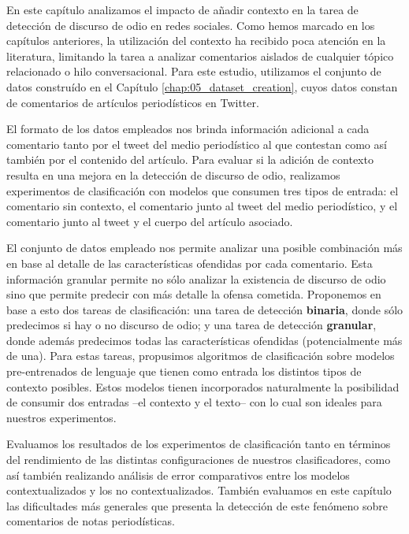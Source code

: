 \label{chap:06_contextualized_hate_speech}

En este capítulo analizamos el impacto de añadir contexto en la tarea de detección de discurso de odio en redes sociales. Como hemos marcado en los capítulos anteriores, la utilización del contexto ha recibido poca atención en la literatura, limitando la tarea a analizar comentarios aislados de cualquier tópico relacionado o hilo conversacional. Para este estudio, utilizamos el conjunto de datos construído en el Capítulo \ref{chap:05_dataset_creation}, cuyos datos constan de comentarios de artículos periodísticos en Twitter.

El formato de los datos empleados nos brinda información adicional a cada comentario tanto por el tweet del medio periodístico al que contestan como así también por el contenido del artículo. Para evaluar si la adición de contexto resulta en una mejora en la detección de discurso de odio, realizamos experimentos de clasificación con modelos que consumen tres tipos de entrada: el comentario sin contexto, el comentario junto al tweet del medio periodístico, y el comentario junto al tweet y el cuerpo del artículo asociado.


El conjunto de datos empleado nos permite analizar una posible combinación más en base al detalle de las características ofendidas por cada comentario. Esta información granular permite no sólo analizar la existencia de discurso de odio sino que permite predecir con más detalle la ofensa cometida. Proponemos en base a esto dos tareas de clasificación: una tarea de detección \textbf{binaria}, donde sólo predecimos si hay o no discurso de odio; y una tarea de detección \textbf{granular}, donde además predecimos todas las características ofendidas (potencialmente más de una). Para estas tareas, propusimos algoritmos de clasificación sobre modelos pre-entrenados de lenguaje que tienen como entrada los distintos tipos de contexto posibles. Estos modelos tienen incorporados naturalmente la posibilidad de consumir dos entradas --el contexto y el texto-- con lo cual son ideales para nuestros experimentos.

Evaluamos los resultados de los experimentos de clasificación tanto en términos del rendimiento de las distintas configuraciones de nuestros clasificadores, como así también realizando análisis de error comparativos entre los modelos contextualizados y los no contextualizados. También evaluamos en este capítulo las dificultades más generales que presenta la detección de este fenómeno sobre comentarios de notas periodísticas.

